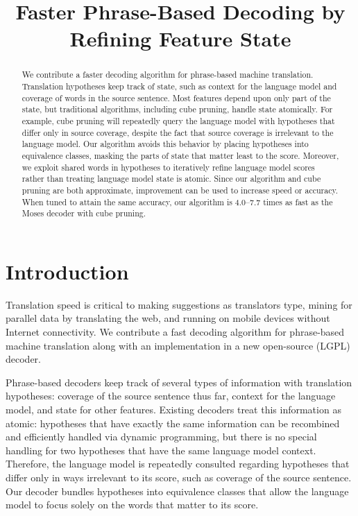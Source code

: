 \documentclass[11pt]{article}
\title{Faster Phrase-Based Decoding by Refining Feature State}
\author{}
\date{}
\begin{document}
\maketitle
\begin{abstract}
We contribute a faster decoding algorithm for phrase-based machine translation.  Translation hypotheses keep track of state, such as context for the language model and coverage of words in the source sentence.  Most features depend upon only part of the state, but traditional algorithms, including cube pruning, handle state atomically.  For example, cube pruning will repeatedly query the language model with hypotheses that differ only in source coverage, despite the fact that source coverage is irrelevant to the language model.  
Our algorithm avoids this behavior by placing hypotheses into equivalence classes, masking the parts of state that matter least to the score.  Moreover, we exploit shared words in hypotheses to iteratively refine language model scores rather than treating language model state is atomic.  Since our algorithm and cube pruning are both approximate, improvement can be used to increase speed or accuracy.  
When tuned to attain the same accuracy, our algorithm is 4.0--7.7 times as fast as the Moses decoder with cube pruning.  
\end{abstract}

\section{Introduction}
\label{intro_label}
Translation speed is critical to making suggestions as translators type, mining for parallel data by translating the web, and running on mobile devices without Internet connectivity.  We contribute a fast decoding algorithm for phrase-based machine translation along with an implementation in a new open-source (LGPL) decoder.  

Phrase-based decoders \cite{moses,phrasal,jane-phrase} keep track of several types of information with translation hypotheses: coverage of the source sentence thus far, context for the language model, and state for other features.  Existing decoders treat this information as atomic: hypotheses that have exactly the same information can be recombined and efficiently handled via dynamic programming, but there is no special handling for two hypotheses that have the same language model context.  Therefore, the language model is repeatedly consulted regarding hypotheses that differ only in ways irrelevant to its score, such as coverage of the source sentence.  Our decoder bundles hypotheses into equivalence classes that allow the language model to focus solely on the words that matter to its score.  
\end{document}
